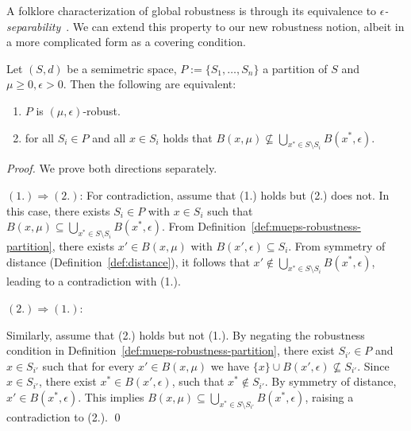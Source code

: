 A folklore characterization of global robustness is through its equivalence to \emph{$\epsilon$-separability}~\cite{yang2020closer,mangal2023certifying}. We can extend this property to our new robustness notion, albeit in a more complicated form as a covering condition. 
\begin{theorem}
\label{thm:separability}
    Let $(S,d)$ be a semimetric space, $P := \{S_1, \dots, S_n\}$ a partition of $S$ and $\mu \geq 0, \epsilon > 0$. Then the following are equivalent:
    \begin{enumerate}
        \item $P$ is $(\mu,\epsilon)$-robust.
        \item for all $S_i \in P$ and all $x \in S_i$ holds that $B(x, \mu) \not\subseteq \bigcup_{x^* \in S \setminus S_i} B(x^*, \epsilon)$.
    \end{enumerate}
\end{theorem}
\begin{proof}
    We prove both directions separately.

    $(1.) \Rightarrow (2.)$: 
    For contradiction, assume that (1.) holds but (2.) does not. In this case, there exists $S_i \in P$ with $x \in S_i$ such that $B(x,\mu) \subseteq \bigcup_{x^* \in S \setminus S_i} B(x^*, \epsilon)$. From Definition~\ref{def:mueps-robustness-partition}, there exists $x' \in B(x,\mu)$ with $B(x',\epsilon) \subseteq S_i$. From symmetry of distance (Definition~\ref{def:distance}), it follows that $x' \notin \bigcup_{x^* \in S \setminus S_i} B(x^*, \epsilon)$, leading to a contradiction with (1.).

    $(2.) \Rightarrow (1.)$:

    Similarly, assume that (2.) holds but not (1.). By negating the robustness condition in Definition~\ref{def:mueps-robustness-partition}, there exist $S_{i'} \in P$ and $x \in S_{i'}$ such that for every $x' \in B(x,\mu)$ we have $\{x\} \cup B(x',\epsilon) \not\subseteq S_{i'}$.
    Since $x \in S_{i'}$, there exist $x^* \in B(x', \epsilon)$, such that $x^* \notin S_{i'}$. By symmetry of distance, $x' \in B(x^*, \epsilon)$.
    This implies $B(x,\mu) \subseteq \bigcup_{x^* \in S \setminus S_{i'}} B(x^*,\epsilon)$, raising a contradiction to (2.).
    \qed
\end{proof}

